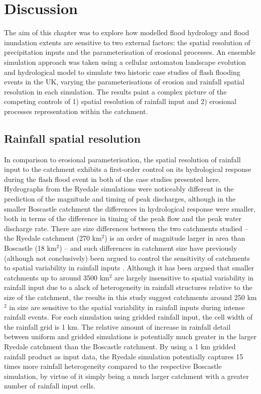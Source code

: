 \section{Discussion}

The aim of this chapter was to explore how modelled flood hydrology and flood inundation extents are sensitive to two external factors: the spatial resolution of precipitation inputs and the parameterisation of erosional processes. An ensemble simulation approach was taken using a cellular automaton landscape evolution and hydrological model to simulate two historic case studies of flash flooding events in the UK, varying the parameterisations of erosion and rainfall spatial resolution in each simulation. The results paint a complex picture of the competing controls of 1) spatial resolution of rainfall input and 2) erosional processes representation within the catchment.

\subsection{Rainfall spatial resolution}
In comparison to erosional parameterisation, the spatial resolution of rainfall input to the catchment exhibits a first-order control on its hydrological response during the flash flood event in both of the case studies presented here. Hydrographs from the Ryedale simulations were noticeably different in the prediction of the magnitude and timing of peak discharges, although in the smaller Boscastle catchment the differences in hydrological response were smaller, both in terms of the difference in timing of the peak flow and the peak water discharge rate. There are size differences between the two catchments studied -- the Ryedale catchment (270 km\(^2\)) is an order of magnitude larger in area than Boscastle (18 km\(^2\)) -- and such differences in catchment size have previously (although not conclusively) been argued to control the sensitivity of catchments to spatial variability in rainfall inputs \citep{krajewski1991monte,nicotina2008impact}. Although it has been argued that smaller catchments up to around 3500 km\(^2\) are largely insensitive to spatial variability in rainfall input due to a alack of heterogeneity in rainfall structures relative to the size of the catchment\citep{nicotina2008impact}, the results in this study suggest catchments around 250 km\(^2\) in size are sensitive to the spatial variability in rainfall inputs during intense rainfall events. For each simulation using gridded rainfall input, the cell width of the rainfall grid is 1 km. The relative amount of increase in rainfall detail between uniform and gridded simulations is potentially much greater in the larger Ryedale catchment than the Boscastle catchment. By using a 1 km gridded rainfall product as input data, the Ryedale simulation potentially captures 15 times more rainfall heterogeneity compared to the respective Boscastle simulation, by virtue of it simply being a much larger catchment with a greater number of rainfall input cells. 


